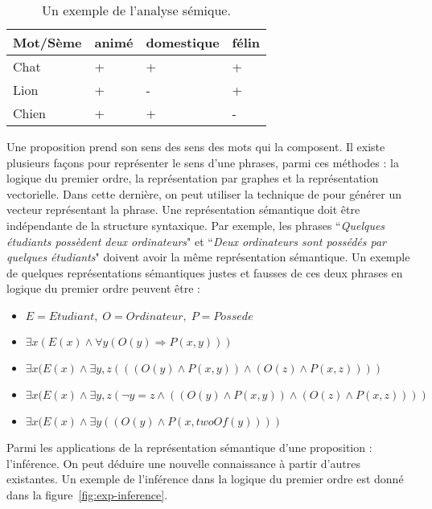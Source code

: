 \documentclass{KodeBook}
\begin{document}
\begin{table}[ht]
	\centering
	\begin{tabular}{|l|l|l|l|}
		\hline
		Mot/Sème & animé & domestique & félin \\
		\hline
		Chat & + & + & + \\
		\hline
		Lion & + & - & + \\
		\hline
		Chien & + & + & - \\
		\hline
	\end{tabular}
	\caption{Un exemple de l'analyse sémique. \label{tab:semique}}
\end{table}

Une proposition prend son sens des sens des mots qui la composent. 
Il existe plusieurs façons pour représenter le sens d'une phrases, parmi ces méthodes : la logique du premier ordre, la représentation par graphes et la représentation vectorielle.
Dans cette dernière, on peut utiliser la technique de  pour générer un vecteur représentant la phrase. 
Une représentation sémantique doit être indépendante de la structure syntaxique.
Par exemple, les phrases ``\textit{Quelques étudiants possèdent deux ordinateurs}" et ``\textit{Deux ordinateurs sont possédés par quelques étudiants}" doivent avoir la même représentation sémantique. 
Un exemple de quelques représentations sémantiques justes et fausses de ces deux phrases en logique du premier ordre peuvent être :
\begin{itemize}
	\item $E = Etudiant, \; O = Ordinateur, \; P = Possede$
	\item $\exists x (E(x) \wedge \forall y ( O(y) \Rightarrow P(x, y)) )$ \textcolor{red}{\XBox}
	\item $\exists x (E(x) \wedge \exists y, z (( (O(y) \wedge P(x, y) ) \wedge (O(z) \wedge P(x, z) ) ))$ \textcolor{red}{\XBox}
	\item $\exists x (E(x) \wedge \exists y, z (\neg y = z \wedge ( (O(y) \wedge P(x, y) ) \wedge (O(z) \wedge P(x, z) ) ))$ \textcolor{green}{\CheckedBox}
	\item $\exists x (E(x) \wedge \exists y ((O(y) \wedge P(x, twoOf(y)) ))$ \textcolor{green}{\CheckedBox}
\end{itemize}
Parmi les applications de la représentation sémantique d'une proposition : l'inférence. 
On peut déduire une nouvelle connaissance à partir d'autres existantes. 
Un exemple de l'inférence dans la logique du premier ordre est donné dans la figure~\ref{fig:exp-inference}.
\end{document}
